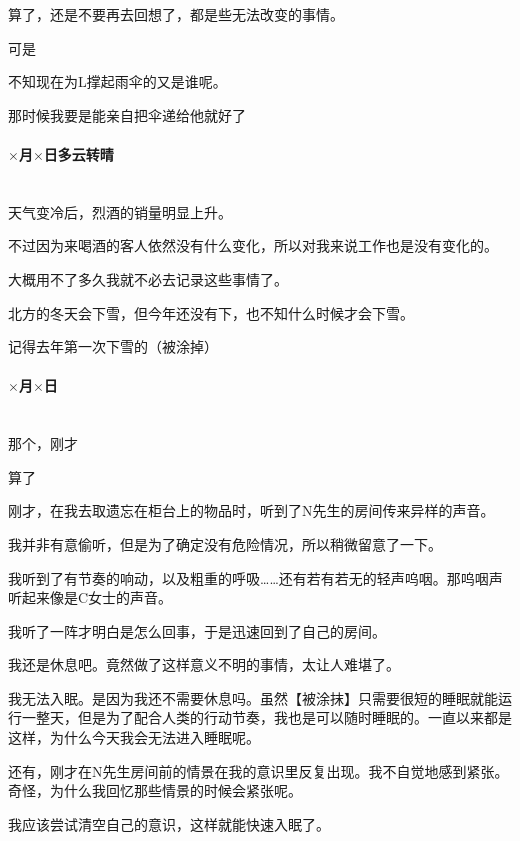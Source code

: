 算了，还是不要再去回想了，都是些无法改变的事情。

可是

不知现在为L撑起雨伞的又是谁呢。

那时候我要是能亲自把伞递给他就好了

\par

\paragraph*{$\times$月$\times$日\quad 多云转晴}\mbox{}\\ 

天气变冷后，烈酒的销量明显上升。

不过因为来喝酒的客人依然没有什么变化，所以对我来说工作也是没有变化的。

大概用不了多久我就不必去记录这些事情了。

北方的冬天会下雪，但今年还没有下，也不知什么时候才会下雪。

记得去年第一次下雪的（被涂掉）

\par

\paragraph*{$\times$月$\times$日}\mbox{}\\

那个，刚才

算了



刚才，在我去取遗忘在柜台上的物品时，听到了N先生的房间传来异样的声音。

我并非有意偷听，但是为了确定没有危险情况，所以稍微留意了一下。

我听到了有节奏的响动，以及粗重的呼吸……还有若有若无的轻声呜咽。那呜咽声听起来像是C女士的声音。

我听了一阵才明白是怎么回事，于是迅速回到了自己的房间。

我还是休息吧。竟然做了这样意义不明的事情，太让人难堪了。



我无法入眠。是因为我还不需要休息吗。虽然【被涂抹】只需要很短的睡眠就能运行一整天，但是为了配合人类的行动节奏，我也是可以随时睡眠的。一直以来都是这样，为什么今天我会无法进入睡眠呢。

还有，刚才在N先生房间前的情景在我的意识里反复出现。我不自觉地感到紧张。奇怪，为什么我回忆那些情景的时候会紧张呢。

我应该尝试清空自己的意识，这样就能快速入眠了。



